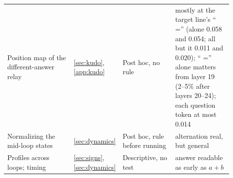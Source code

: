 \documentclass{article}
\begin{document}
{\begin{longtable}{@{}L{0.33\linewidth}L{0.06\linewidth}L{0.25\linewidth}L{0.28\linewidth}@{}}
Position map of the different-answer relay & \ref{sec:kudo}, \ref{app:kudo} & Post hoc, no rule & mostly at the target line's `` ='' (alone 0.058 and 0.054; all but it 0.011 and 0.020); `` ='' alone matters from layer 19 (2--5\% after layers 20--24); each question token at most 0.014 \\
Normalizing the mid-loop states &\ref{sec:dynamics} & Post hoc, rule before running & alternation real, but general \\
Profiles across loops; timing & \ref{sec:signs}, \ref{sec:dynamics} & Descriptive, no test & answer readable as early as $a+b$ \\
\bottomrule
\end{longtable}
}
\end{document}
